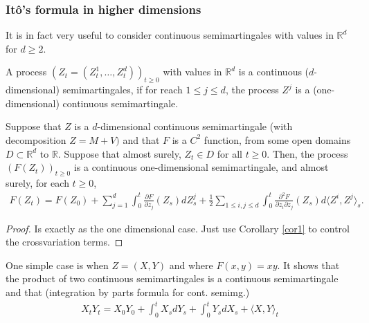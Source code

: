 \documentclass[../mainfile.tex]{subfiles}
\begin{document}
\subsubsection{Itô's formula in higher dimensions}
It is in fact very useful to consider continuous semimartingales with values in $\mathbb{R}^d$ for $d \geq 2$.
\begin{defn} A process $(Z_t=(Z_t^1, \dots , Z_t^d))_{t \geq 0}$ with values in $\mathbb{R}^d$ is a continuous ($d$-dimensional) semimartingales, if for reach $1 \leq j \leq d$, the process $Z^j$ is a (one-dimensional) continuous semimartingale.
\end{defn}
\begin{thm} Suppose that $Z$ is a $d$-dimensional continuous semimartingale (with decomposition $Z=M+V)$ and that $F$ is a $C^2$ function,  from some open domains $D \subset \mathbb{R}^d$ to $\mathbb{R}$. Suppose that almost surely, $Z_t \in D$ for all $t \geq 0$. Then,  the process $(F(Z_t))_{t \geq 0}$ is a continuous one-dimensional semimartingale, and almost surely, for each $t \geq 0$,
\begin{align*}
F(Z_t)=F(Z_0) + \sum_{j=1}^d \int_0^t \frac{\partial F}{\partial z_j}(Z_s) d Z_s^j + \frac{1}{2} \sum_{1\leq i,j \leq d } \int_0^t \frac{\partial^2 F}{\partial z_i \partial z_j}(Z_s)d \langle Z^i, Z^j \rangle_s. 
\end{align*}
\end{thm}
\begin{proof}
Is exactly as the one dimensional case. Just use Corollary \ref{cor1} to control the crossvariation terms. 
\end{proof}
\begin{rem}One simple case is when $Z=(X,Y)$ and where $F(x,y)=xy$.  It shows that the product of two continuous semimartingales is a continuous semimartingale and that (integration by parts formula for cont. semimg.)
\begin{align*}
X_tY_t = X_0Y_0 + \int_0^t X_sdY_s + \int_0^t Y_s dX_s + \langle X,Y \rangle_t 
\end{align*}
\end{rem}
\newpage
\end{document}
